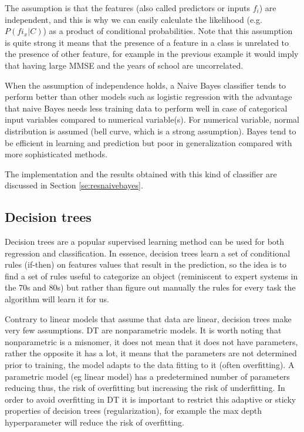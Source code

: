 \documentclass[11pt]{article}
\begin{document}
The assumption is that the features (also called predictors or inputs $f_i$) are independent, and this is why we can easily calculate the likelihood (e.g. $P(fi_x|C)$) as a product of conditional probabilities. Note that this assumption is quite strong it means that the presence of a feature in a class is unrelated to the presence of other feature, for example in the previous example it would imply that having large MMSE and the years of school are uncorrelated.

When the assumption of independence holds, a Naive Bayes classifier tends to perform better than other models such as logistic regression with the advantage that naive Bayes needs less training data to perform well in case of categorical input variables compared to numerical variable(s). For numerical variable, normal distribution is assumed (bell curve, which is a strong assumption).
Bayes tend to be efficient in learning and prediction but poor in generalization compared with more sophisticated methods.

The implementation and the results obtained with this kind of classifier are discussed in Section \ref{se:resnaivebayes}.

\subsection{Decision trees}
\label{sse:dectrees}
Decision trees are a popular supervised learning method can be used for both regression and classification.
In essence, decision trees learn a set of conditional rules (if-then) on features values that result in the prediction, so the idea is to find a set of rules useful to categorize an object (reminiscent to expert systems in the 70s and 80s) but rather than figure out manually the rules for every task the algorithm will learn it for us.

Contrary to linear models that assume that data are linear, decision trees make very few assumptions.
DT are nonparametric models. It is worth noting that nonparametric is a misnomer, it does not mean that it does not have parameters, rather the opposite it has a lot, it means that the parameters are not determined prior to training, the model adapts to the data fitting to it (often overfitting). A parametric model (eg linear model) has a predetermined number of parameters reducing thus, the risk of overfitting but increasing the risk of underfitting. In order to avoid overfitting in DT it is important to restrict this adaptive or sticky properties of decision trees (regularization), for example the max depth hyperparameter will reduce the risk of overfitting.
\end{document}
